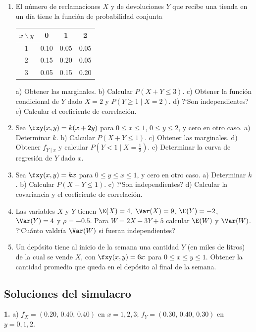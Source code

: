 \begin{enumerate}[label=\textbf{\arabic*.-},leftmargin=*]
\item El n\'umero de reclamaciones $X$ y de devoluciones $Y$ que recibe una tienda en un d\'ia tiene la funci\'on de probabilidad conjunta
\begin{center}
\begin{tabular}{c|ccc}
$x\backslash y$ & 0 & 1 & 2\\ \hline
1 & 0.10 & 0.05 & 0.05\\
2 & 0.15 & 0.20 & 0.05\\
3 & 0.05 & 0.15 & 0.20
\end{tabular}
\end{center}
a) Obtener las marginales. b) Calcular $P(X+Y\le3)$. c) Obtener la funci\'on condicional de $Y$ dado $X=2$ y $P(Y\ge1\mid X=2)$.
d) ?`Son independientes? e) Calcular el coeficiente de correlaci\'on.

\item Sea $\fxy(x,y)=k(x+2y)$ para $0\le x\le1$, $0\le y\le2$, y cero en otro caso.
a) Determinar $k$. b) Calcular $P(X+Y\le1)$. c) Obtener las marginales. d) Obtener $f_{Y\mid x}$ y calcular $P(Y<1\mid X=\tfrac12)$.
e) Determinar la curva de regresi\'on de $Y$ dado $x$.

\item Sea $\fxy(x,y)=kx$ para $0\le y\le x\le1$, y cero en otro caso.
a) Determinar $k$. b) Calcular $P(X+Y\le1)$. c) ?`Son independientes? d) Calcular la covariancia y el coeficiente de correlaci\'on.

\item Las variables $X$ y $Y$ tienen $\E(X)=4$, $\Var(X)=9$, $\E(Y)=-2$, $\Var(Y)=4$ y $\rho=-0.5$.
Para $W=2X-3Y+5$ calcular $\E(W)$ y $\Var(W)$. ?`Cu\'anto valdr\'ia $\Var(W)$ si fueran independientes?

\item Un dep\'osito tiene al inicio de la semana una cantidad $Y$ (en miles de litros) de la cual se vende $X$, con
$\fxy(x,y)=6x$ para $0\le x\le y\le1$. Obtener la cantidad promedio que queda en el dep\'osito al final de la semana.
\end{enumerate}

\newpage
\subsection*{Soluciones del simulacro}

\textbf{1.} a) $f_X=(0.20,\,0.40,\,0.40)$ en $x=1,2,3$; $f_Y=(0.30,\,0.40,\,0.30)$ en $y=0,1,2$.

